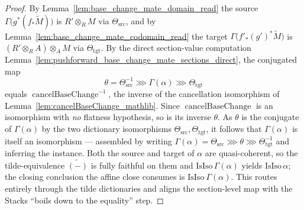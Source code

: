 \begin{proof}
  By Lemma~\ref{lem:base_change_mate_domain_read} the
  source \(\Gamma\bigl(g^*(f_*\widetilde M)\bigr)\) is \(R' \otimes_R M\) via
  \(\Theta_{\mathrm{src}}\), and by Lemma~\ref{lem:base_change_mate_codomain_read} the
  target \(\Gamma\bigl(f'_*(g')^*\widetilde M\bigr)\) is \((R' \otimes_R A) \otimes_A M\)
  via \(\Theta_{\mathrm{tgt}}\). By the direct section-value computation
  Lemma~\ref{lem:pushforward_base_change_mate_sections_direct}, the conjugated map
  \[
    \theta = \Theta_{\mathrm{src}}^{-1} \ggg \Gamma(\alpha) \ggg \Theta_{\mathrm{tgt}}
  \]
  equals \(\operatorname{cancelBaseChange}^{-1}\), the inverse of the cancellation
  isomorphism of Lemma~\ref{lem:cancelBaseChange_mathlib}. Since
  \(\operatorname{cancelBaseChange}\) is an isomorphism with \emph{no} flatness
  hypothesis, so is its inverse \(\theta\). As \(\theta\) is the conjugate of
  \(\Gamma(\alpha)\) by the two dictionary isomorphisms
  \(\Theta_{\mathrm{src}}, \Theta_{\mathrm{tgt}}\), it follows that \(\Gamma(\alpha)\) is
  itself an isomorphism — assembled by writing
  \(\Gamma(\alpha) = \Theta_{\mathrm{src}} \ggg \theta \ggg \Theta_{\mathrm{tgt}}^{-1}\)
  and inferring the instance. Both the source and target of \(\alpha\) are
  quasi-coherent, so the tilde-equivalence \(\widetilde{(-)}\) is fully faithful on
  them and \(\mathrm{IsIso}\,\Gamma(\alpha)\) yields \(\mathrm{IsIso}\,\alpha\); the
  closing conclusion the affine close consumes is \(\mathrm{IsIso}\ \Gamma(\alpha)\).
  This routes entirely through the tilde dictionaries and aligns the
  section-level map with the Stacks ``boils down to the equality'' step.
\end{proof}

